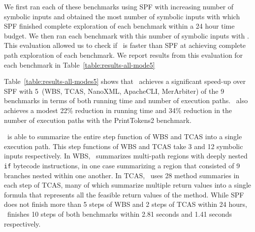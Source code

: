 We first ran each of these benchmarks using SPF with increasing number of symbolic inputs and obtained the most number
of symbolic inputs with which SPF finished complete exploration of each benchmark within a 24 hour time budget.
%
We then ran each benchmark with this number of symbolic inputs with \tool.
%
This evaluation allowed us to check if \tool\ is faster than SPF at achieving complete path exploration of each benchmark.
%
%
We report results from this evaluation for each benchmark in Table~\ref{table:results-all-mode5}
%
%

%

%
Table~\ref{table:results-all-modes5} shows that \tool\ achieves a significant speed-up over SPF with
5~(WBS, TCAS, NanoXML, ApacheCLI, MerArbiter) of the 9 benchmarks in terms of both running time and number of
execution paths.
%
\tool\ also achieves a modest 22\% reduction in running time and 34\% reduction
in the number of execution paths with the PrintTokens2 benchmark.

\tool\ is able to summarize the entire step function of WBS and TCAS into a single execution path.
%
This step functions of WBS and TCAS take 3 and 12 symbolic inputs respectively.
%
In WBS, \tool\ summarizes multi-path regions with deeply nested {\tt if} bytecode instructions, in one case
summarizing a region that consisted of 9 branches nested within one another.
%
In TCAS, \tool\ uses 28 method summaries in each step of TCAS, many of which summarize multiple return values
into a single formula that represents all the feasible return values of the method.
%
While SPF does not finish more than 5 steps of WBS and 2 steps of TCAS within 24 hours, \tool\ finishes 10 steps of both
benchmarks within 2.81 seconds and 1.41 seconds respectively.

